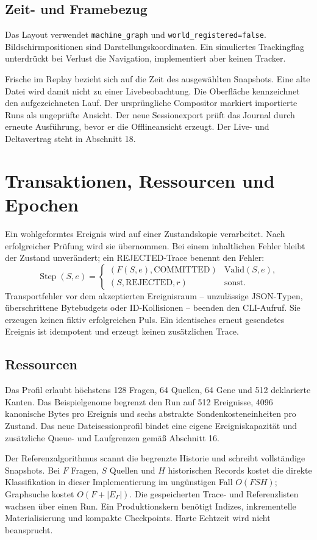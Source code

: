 \documentclass[11pt,a4paper]{article}
\newcommand{\nextsection}[2]{\clearpage{\color{accent}\small\textsf{#1}}\section{#2}}
\begin{document}
\subsection{Zeit- und Framebezug}
Das Layout verwendet \texttt{machine\_graph} und
\texttt{world\_registered=false}. Bildschirmpositionen sind
Darstellungskoordinaten. Ein simuliertes Trackingflag unterdrückt
bei Verlust die Navigation, implementiert aber keinen Tracker.

Frische im Replay bezieht sich auf die Zeit des ausgewählten
Snapshots. Eine alte Datei wird damit nicht zu einer Livebeobachtung.
Die Oberfläche kennzeichnet den aufgezeichneten Lauf.
Der ursprüngliche Compositor markiert importierte Runs als
ungeprüfte Ansicht. Der neue Sessionexport prüft das Journal
durch erneute Ausführung, bevor er die Offlineansicht erzeugt.
Der Live- und Deltavertrag steht in Abschnitt 18.

\nextsection{11 / BETRIEBSVERTRAG}{Transaktionen, Ressourcen und Epochen}
Ein wohlgeformtes Ereignis wird auf einer Zustandskopie verarbeitet.
Nach erfolgreicher Prüfung wird sie übernommen. Bei einem
inhaltlichen Fehler bleibt der Zustand unverändert; ein REJECTED-Trace
benennt den Fehler:
\[
\operatorname{Step}(S,e)=
\begin{cases}
(F(S,e),\mathrm{COMMITTED}) & \mathrm{Valid}(S,e),\\
(S,\mathrm{REJECTED},r) & \text{sonst}.
\end{cases}
\]
Transportfehler vor dem akzeptierten Ereignisraum -- unzulässige
JSON-Typen, überschrittene Bytebudgets oder ID-Kollisionen --
beenden den CLI-Aufruf. Sie erzeugen keinen fiktiv erfolgreichen Puls.
Ein identisches erneut gesendetes Ereignis ist idempotent und
erzeugt keinen zusätzlichen Trace.

\subsection{Ressourcen}
Das Profil erlaubt höchstens 128 Fragen, 64 Quellen, 64 Gene und
512 deklarierte Kanten. Das Beispielgenome begrenzt den Run
auf 512 Ereignisse, 4096 kanonische Bytes pro Ereignis und
sechs abstrakte Sondenkosteneinheiten pro Zustand.
Das neue Dateisessionprofil bindet eine eigene Ereigniskapazität
und zusätzliche Queue- und Laufgrenzen gemäß Abschnitt 16.

Der Referenzalgorithmus scannt die begrenzte Historie und schreibt
vollständige Snapshots. Bei $F$ Fragen, $S$ Quellen und $H$
historischen Records kostet die direkte Klassifikation in dieser
Implementierung im ungünstigen Fall $O(FSH)$; Graphsuche kostet
$O(F+|E_\Gamma|)$. Die gespeicherten Trace- und Referenzlisten
wachsen über einen Run. Ein Produktionskern benötigt Indizes,
inkrementelle Materialisierung und kompakte Checkpoints.
Harte Echtzeit wird nicht beansprucht.
\end{document}
